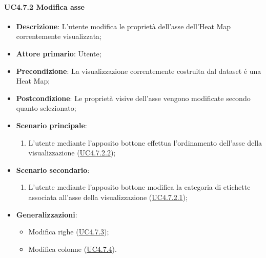 \paragraph{UC4.7.2 Modifica asse}
\label{par:uc4.7.2}
\begin{itemize}
    \item \textbf{Descrizione}:     L'utente modifica le proprietà dell'asse dell'Heat Map correntemente visualizzata;
    \item \textbf{Attore primario}: Utente;

    \item \textbf{Precondizione}:   La visualizzazione correntemente costruita dal dataset é una Heat Map;
    \item \textbf{Postcondizione}:  Le proprietà visive dell'asse vengono modificate secondo quanto selezionato;
    \item \textbf{Scenario principale}:
    \begin{enumerate}
        \item L'utente mediante l'apposito bottone effettua l'ordinamento dell'asse della visualizzazione (\hyperref[spar:uc4.7.2.2]{UC4.7.2.2});
    \end{enumerate}
    \item \textbf{Scenario secondario}:
    \begin{enumerate}
        \item L'utente mediante l'apposito bottone modifica la categoria di etichette associata all'asse della visualizzazione (\hyperref[spar:uc4.7.2.1]{UC4.7.2.1});
    \end{enumerate}
    \item \textbf{Generalizzazioni}: 
    \begin{itemize}
        \item Modifica righe (\hyperref[par:uc4.7.3]{UC4.7.3});
        \item Modifica colonne (\hyperref[par:uc4.7.4]{UC4.7.4}).
    \end{itemize}
\end{itemize}

